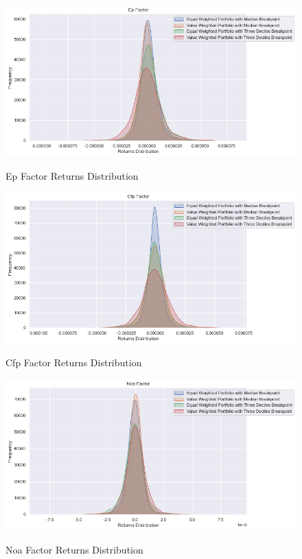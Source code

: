 \begin{figure}[H]
	\caption{Ep Factor Returns Distribution}
	\centering
	\includegraphics[scale=.63]{../../output/figures/ep.png}
	\label{fig:ep}
\end{figure}

\begin{figure}[H]
	\caption{Cfp Factor Returns Distribution}
	\centering
	\includegraphics[scale=.63]{../../output/figures/cfp.png}
	\label{fig:cfp}
\end{figure}

\begin{figure}[H]
	\caption{Noa Factor Returns Distribution}
	\centering
	\includegraphics[scale=.63]{../../output/figures/noa.png}
	\label{fig:noa}
\end{figure}

